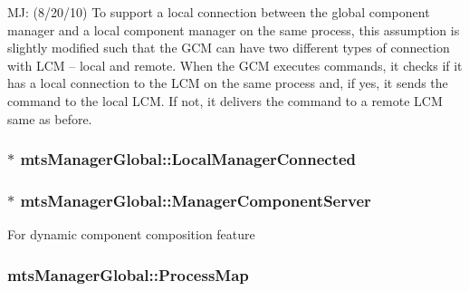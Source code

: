 M\-J\-: (8/20/10) To support a local connection between the global component manager and a local component manager on the same process, this assumption is slightly modified such that the G\-C\-M can have two different types of connection with L\-C\-M -- local and remote. When the G\-C\-M executes commands, it checks if it has a local connection to the L\-C\-M on the same process and, if yes, it sends the command to the local L\-C\-M. If not, it delivers the command to a remote L\-C\-M same as before. \hypertarget{classmts_manager_global_a3d6e45758c38a5b82664675f9f58fcc8}{
\subsubsection[{Local\-Manager\-Connected}]{$\ast$ mts\-Manager\-Global\-::\-Local\-Manager\-Connected\hspace{0.3cm}{\ttfamily [protected]}}}\label{classmts_manager_global_a3d6e45758c38a5b82664675f9f58fcc8}
\hypertarget{classmts_manager_global_af326d688537352e3106b819adfae11eb}{
\subsubsection[{Manager\-Component\-Server}]{$\ast$ mts\-Manager\-Global\-::\-Manager\-Component\-Server\hspace{0.3cm}{\ttfamily [protected]}}}\label{classmts_manager_global_af326d688537352e3106b819adfae11eb}
For dynamic component composition feature \hypertarget{classmts_manager_global_a15ef83ea8929f672214f5ff8fcb9eefa}{
\subsubsection[{Process\-Map}]{ mts\-Manager\-Global\-::\-Process\-Map\hspace{0.3cm}{\ttfamily [protected]}}}\label{classmts_manager_global_a15ef83ea8929f672214f5ff8fcb9eefa}
